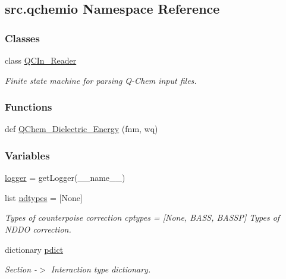 \hypertarget{namespacesrc_1_1qchemio}{}\subsection{src.\+qchemio Namespace Reference}
\label{namespacesrc_1_1qchemio}
\subsubsection*{Classes}
\begin{DoxyCompactItemize}
\item 
class \hyperlink{classsrc_1_1qchemio_1_1QCIn__Reader}{Q\+C\+In\+\_\+\+Reader}
\begin{DoxyCompactList}\small\item\em Finite state machine for parsing Q-\/\+Chem input files. \end{DoxyCompactList}\end{DoxyCompactItemize}
\subsubsection*{Functions}
\begin{DoxyCompactItemize}
\item 
def \hyperlink{namespacesrc_1_1qchemio_a6d8c4a784dca15418d6e89fbde845611}{Q\+Chem\+\_\+\+Dielectric\+\_\+\+Energy} (fnm, wq)
\end{DoxyCompactItemize}
\subsubsection*{Variables}
\begin{DoxyCompactItemize}
\item 
\hyperlink{namespacesrc_1_1qchemio_afb2d0a18f630955d2ad00ba5a97889bc}{logger} = get\+Logger(\+\_\+\+\_\+name\+\_\+\+\_\+)
\item 
list \hyperlink{namespacesrc_1_1qchemio_a50bb8a1c1f0a033941377d8ff121529b}{ndtypes} = \mbox{[}None\mbox{]}
\begin{DoxyCompactList}\small\item\em Types of counterpoise correction cptypes = \mbox{[}None, \textquotesingle{}B\+A\+SS\textquotesingle{}, \textquotesingle{}B\+A\+S\+SP\textquotesingle{}\mbox{]} Types of N\+D\+DO correction. \end{DoxyCompactList}\item 
dictionary \hyperlink{namespacesrc_1_1qchemio_a360e0e02d18612db04a126c58afde31b}{pdict}
\begin{DoxyCompactList}\small\item\em Section -\/$>$ Interaction type dictionary. \end{DoxyCompactList}\end{DoxyCompactItemize}


